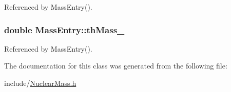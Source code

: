 Referenced by Mass\-Entry().

\hypertarget{classMassEntry_a8fd951ec49bba7068699a48c44e9041b}{
\subsubsection[{th\-Mass\-\_\-}]{\setlength{\rightskip}{0pt plus 5cm}double Mass\-Entry\-::th\-Mass\-\_\-}}\label{classMassEntry_a8fd951ec49bba7068699a48c44e9041b}


Referenced by Mass\-Entry().



The documentation for this class was generated from the following file\-:\begin{DoxyCompactItemize}
\item 
include/\hyperlink{NuclearMass_8h}{Nuclear\-Mass.\-h}\end{DoxyCompactItemize}
